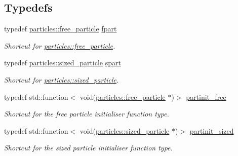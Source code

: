 \subsection*{Typedefs}
\begin{DoxyCompactItemize}
\item 
\mbox{\label{namespacephysim_1_1init_a3ee179a015a8feec7dc58eeb4e1f2783}} 
typedef \hyperlink{classphysim_1_1particles_1_1free__particle}{particles\+::free\+\_\+particle} \hyperlink{namespacephysim_1_1init_a3ee179a015a8feec7dc58eeb4e1f2783}{fpart}
\begin{DoxyCompactList}\small\item\em Shortcut for \hyperlink{classphysim_1_1particles_1_1free__particle}{particles\+::free\+\_\+particle}. \end{DoxyCompactList}\item 
\mbox{\label{namespacephysim_1_1init_a8b9f311523ca787a21c91bdaf28ac1a5}} 
typedef \hyperlink{classphysim_1_1particles_1_1sized__particle}{particles\+::sized\+\_\+particle} \hyperlink{namespacephysim_1_1init_a8b9f311523ca787a21c91bdaf28ac1a5}{spart}
\begin{DoxyCompactList}\small\item\em Shortcut for \hyperlink{classphysim_1_1particles_1_1sized__particle}{particles\+::sized\+\_\+particle}. \end{DoxyCompactList}\item 
\mbox{\label{namespacephysim_1_1init_a075c918c300c8a7eb1e3449f8848be22}} 
typedef std\+::function$<$ void(\hyperlink{classphysim_1_1particles_1_1free__particle}{particles\+::free\+\_\+particle} $\ast$)$>$ \hyperlink{namespacephysim_1_1init_a075c918c300c8a7eb1e3449f8848be22}{partinit\+\_\+free}
\begin{DoxyCompactList}\small\item\em Shortcut for the free particle initialiser function type. \end{DoxyCompactList}\item 
\mbox{\label{namespacephysim_1_1init_a366bf3e2a64457ad4e3b16c6d671bf7c}} 
typedef std\+::function$<$ void(\hyperlink{classphysim_1_1particles_1_1sized__particle}{particles\+::sized\+\_\+particle} $\ast$)$>$ \hyperlink{namespacephysim_1_1init_a366bf3e2a64457ad4e3b16c6d671bf7c}{partinit\+\_\+sized}
\begin{DoxyCompactList}\small\item\em Shortcut for the sized particle initialiser function type. \end{DoxyCompactList}\end{DoxyCompactItemize}


